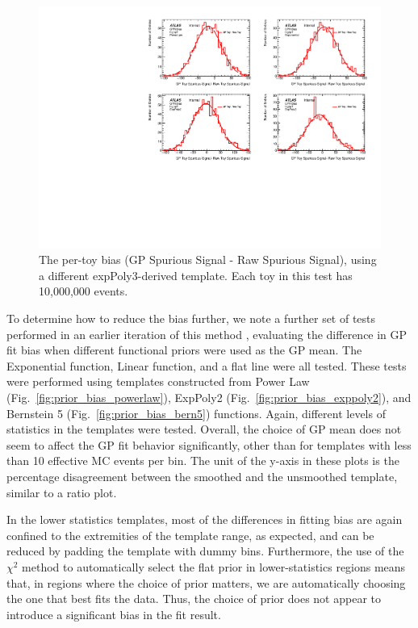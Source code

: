 \begin{figure} 
\begin{center}
  \includegraphics[width=\textwidth]{figures/background/gpr/validation/nominal/ToyTest_FitSigBiases_highpT_10M_noSig}   
\caption{The per-toy bias (GP Spurious Signal - Raw Spurious Signal), using a different expPoly3-derived template. Each toy in this test has 10,000,000 events.}
\label{fig:bias_highpt_10M_noSig}
\end{center}
\end{figure}

To determine how to reduce the bias further, we note a further set of tests performed in an earlier iteration of this method \cite{Hyneman:2712576}, evaluating the difference in GP fit bias when different functional priors were used as the GP mean. The Exponential function, Linear function, and a flat line were all tested. These tests were performed using templates constructed from Power Law (Fig.~\ref{fig:prior_bias_powerlaw}), ExpPoly2 (Fig.~\ref{fig:prior_bias_exppoly2}), and Bernstein 5 (Fig.~\ref{fig:prior_bias_bern5}) functions. Again, different levels of statistics in the templates were tested. Overall, the choice of GP mean does not seem to affect the GP fit behavior significantly, other than for templates with less than 10 effective MC events per bin. The unit of the y-axis in these plots is the percentage disagreement between the smoothed and the unsmoothed template, similar to a ratio plot.

In the lower statistics templates, most of the differences in fitting bias are again confined to the extremities of the template range, as expected, and can be reduced by padding the template with dummy bins. Furthermore, the use of the $\chi^2$ method to automatically select the flat prior in lower-statistics regions means that, in regions where the choice of prior matters, we are automatically choosing the one that best fits the data. Thus, the choice of prior does not appear to introduce a significant bias in the fit result. 

